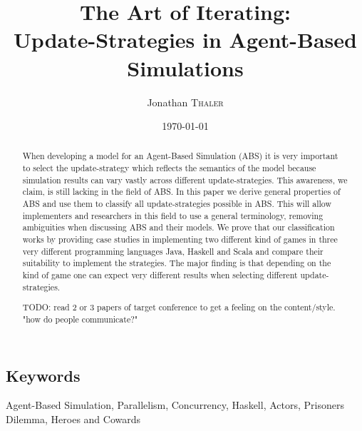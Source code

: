 \documentclass[twocolumn, 10pt]{article}
\title{The Art of Iterating:\\Update-Strategies in Agent-Based Simulations} %
\author{Jonathan \textsc{Thaler}} %
\date{\today} %
\begin{document}
%
\maketitle %

\begin{abstract}
When developing a model for an Agent-Based Simulation (ABS) it is very important to select the update-strategy which reflects the semantics of the model because simulation results can vary vastly across different update-strategies. This awareness, we claim, is still lacking in the field of ABS. In this paper we derive general properties of ABS and use them to classify all update-strategies possible in ABS. This will allow implementers and researchers in this field to use a general terminology, removing ambiguities when discussing ABS and their models. We prove that our classification works by providing case studies in implementing two different kind of games in three very different programming languages Java, Haskell and Scala and compare their suitability to implement the strategies. The major finding is that depending on the kind of game one can expect very different results when selecting different update-strategies.

TODO: read 2 or 3 papers of target conference to get a feeling on the content/style. "how do people communicate?"
\end{abstract}

\subsection*{Keywords}
Agent-Based Simulation, Parallelism, Concurrency, Haskell, Actors, Prisoners Dilemma, Heroes and Cowards













\newpage



\end{document}
